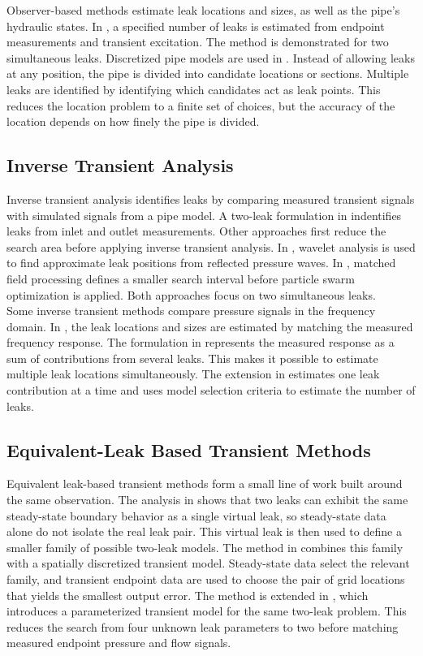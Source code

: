 Observer-based methods estimate leak locations and sizes, as well as the pipe's hydraulic states. In \cite{besancon2007}, a specified number of leaks is estimated from endpoint measurements and transient excitation. The method is demonstrated for two simultaneous leaks. Discretized pipe models are used in \cite{torres2009,verde2001}. Instead of allowing leaks at any position, the pipe is divided into candidate locations or sections. Multiple leaks are identified by identifying which candidates act as leak points. This reduces the location problem to a finite set of choices, but the accuracy of the location depends on how finely the pipe is divided.

\subsection*{Inverse Transient Analysis}

Inverse transient analysis identifies leaks by comparing measured transient signals with simulated signals from a pipe model. A two-leak formulation in \cite{diaz2021} indentifies leaks from inlet and outlet measurements. Other approaches first reduce the search area before applying inverse transient analysis. In \cite{nadian2025}, wavelet analysis is used to find approximate leak positions from reflected pressure waves. In \cite{cherif2025}, matched field processing defines a smaller search interval before particle swarm optimization is applied. Both approaches focus on two simultaneous leaks.\\

Some inverse transient methods compare pressure signals in the frequency domain. In \cite{hyun2018}, the leak locations and sizes are estimated by matching the measured frequency response. The formulation in \cite{wang2018} represents the measured response as a sum of contributions from several leaks. This makes it possible to estimate multiple leak locations simultaneously. The extension in \cite{wang2019} estimates one leak contribution at a time and uses model selection criteria to estimate the number of leaks.

\subsection*{Equivalent-Leak Based Transient Methods}

Equivalent leak-based transient methods form a small line of work built around the same observation. The analysis in \cite{verde2004} shows that two leaks can exhibit the same steady-state boundary behavior as a single virtual leak, so steady-state data alone do not isolate the real leak pair. This virtual leak is then used to define a smaller family of possible two-leak models. The method in \cite{verde2007} combines this family with a spatially discretized transient model. Steady-state data select the relevant family, and transient endpoint data are used to choose the pair of grid locations that yields the smallest output error. The method is extended in \cite{verde2014}, which introduces a parameterized transient model for the same two-leak problem. This reduces the search from four unknown leak parameters to two before matching measured endpoint pressure and flow signals.

